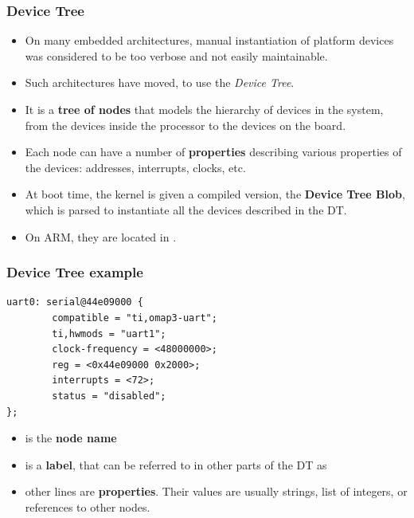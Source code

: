 \begin{frame}
  \frametitle{Device Tree}
  \begin{itemize}
  \item On many embedded architectures, manual instantiation of
    platform devices was considered to be too verbose and not easily
    maintainable.
  \item Such architectures have moved, to use the {\em Device Tree}.
  \item It is a {\bf tree of nodes} that models the hierarchy of
    devices in the system, from the devices inside the processor to
    the devices on the board.
  \item Each node can have a number of {\bf properties} describing
    various properties of the devices: addresses, interrupts, clocks,
    etc.
  \item At boot time, the kernel is given a compiled version, the {\bf
      Device Tree Blob}, which is parsed to instantiate all the
    devices described in the DT.
  \item On ARM, they are located in .
  \end{itemize}
\end{frame}

\begin{frame}[fragile]
  \frametitle{Device Tree example}
  \begin{block}{}
\begin{verbatim}
uart0: serial@44e09000 {
        compatible = "ti,omap3-uart";
        ti,hwmods = "uart1";
        clock-frequency = <48000000>;
        reg = <0x44e09000 0x2000>;
        interrupts = <72>;
        status = "disabled";
};
  \end{verbatim}
  \end{block}
  \normalsize
  \begin{itemize}
  \item {} is the {\bf node name}
  \item {} is a {\bf label}, that can be referred to in other
    parts of the DT as 
  \item other lines are {\bf properties}. Their values are usually
    strings, list of integers, or references to other nodes.
  \end{itemize}
\end{frame}

